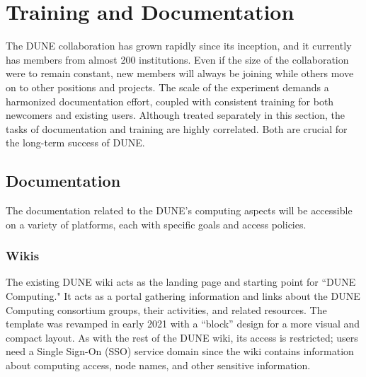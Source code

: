 \documentclass[../main-v1.tex]{subfiles}
\begin{document}
\chapter{Training and Documentation }
\label{ch:train}
The DUNE collaboration has grown rapidly since its inception, and it currently has members from almost 200 institutions.  Even if the size of the collaboration were to remain constant, new members will always be joining while others move on to other positions and projects.  The scale of the experiment demands a harmonized documentation effort, coupled with consistent training for both newcomers and existing users. Although treated separately in this section, the tasks of documentation and training are highly correlated. Both are crucial for the long-term success of DUNE. 

\section{Documentation}
The documentation related to the DUNE’s computing aspects will be accessible on a variety of platforms, each with specific goals and access policies.

\subsection{Wikis}
The existing DUNE wiki acts as the landing page and starting point for ``DUNE Computing." It acts as a portal gathering information and links about the DUNE Computing consortium groups, %
their activities, and related resources. The template %
was revamped in early 2021 with a ``block'' design for a more visual and compact layout. As with the rest of the DUNE wiki, its access is restricted; users need a  Single Sign-On (SSO) service domain since the wiki contains information about computing access, node names, and other sensitive information. 
\end{document}
